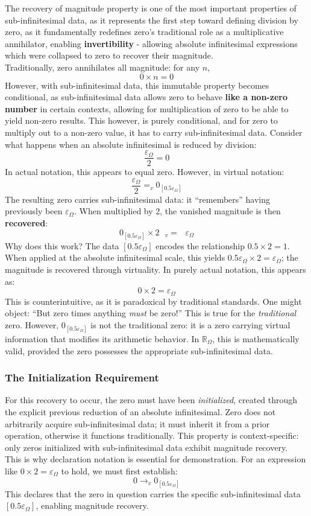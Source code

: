 \documentclass{article}
\begin{document}
The recovery of magnitude property is one of the most important properties of sub-infinitesimal data, as it represents the first step toward defining division by zero, as it fundamentally redefines zero's traditional role as a multiplicative annihilator, enabling \textbf{invertibility} - allowing absolute infinitesimal expressions which were collapsed to zero to recover their magnitude.
\\Traditionally, zero annihilates all magnitude: for any $n$,
$$0 \times n = 0$$ However, with sub-infinitesimal data, this immutable property becomes conditional, as sub-infinitesimal data allows zero to behave \textbf{like a non-zero number} in certain contexts, allowing for multiplication of zero to be able to yield non-zero results. This however, is purely conditional, and for zero to multiply out to a non-zero value, it has to carry sub-infinitesimal data. Consider what happens when an absolute infinitesimal is reduced by division:
$$\frac{\varepsilon_\Omega}{2} = 0$$In actual notation, this appears to equal zero. However, in virtual notation:
$$\frac{\varepsilon_\Omega}{2} =_v 0_{[0.5\varepsilon_\Omega]}$$ The resulting zero carries sub-infinitesimal data: it ``remembers'' having previously been $\varepsilon_\Omega$. When multiplied by 2, the vanished magnitude is then \textbf{recovered}:
$$0_{[0.5\varepsilon_\Omega]} \times 2\text{ } _v{=} \text{ }\varepsilon_\Omega$$ Why does this work? The data $[0.5\varepsilon_\Omega]$ encodes the relationship $0.5 \times 2 = 1$. When applied at the absolute infinitesimal scale, this yields $0.5\varepsilon_\Omega \times 2 = \varepsilon_\Omega$; the magnitude is recovered through virtuality.
In purely actual notation, this appears as:
$$0 \times 2 = \varepsilon_\Omega$$ This is counterintuitive, as it is paradoxical by traditional standards. One might object: ``But zero times anything \textit{must} be zero!'' This is true for the \textit{traditional} zero. However, $0_{[0.5\varepsilon_\Omega]}$ is not the traditional zero: it is a zero carrying virtual information that modifies its arithmetic behavior. In $\mathbb{R}_\Omega$, this is mathematically valid, provided the zero possesses the appropriate sub-infinitesimal data.

\subsubsection{The Initialization Requirement} For this recovery to occur, the zero must have been \textit{initialized}, created through the explicit previous reduction of an absolute infinitesimal. Zero does not arbitrarily acquire sub-infinitesimal data; it must inherit it from a prior operation, otherwise it functions traditionally. This property is context-specific: only zeros initialized with sub-infinitesimal data exhibit magnitude recovery. \\This is why declaration notation is essential for demonstration. For an expression like $0 \times 2 = \varepsilon_\Omega$ to hold, we must first establish:
$$0 \to_v 0_{[0.5\varepsilon_\Omega]}$$ This declares that the zero in question carries the specific sub-infinitesimal data $[0.5\varepsilon_\Omega]$, enabling magnitude recovery.
\end{document}
